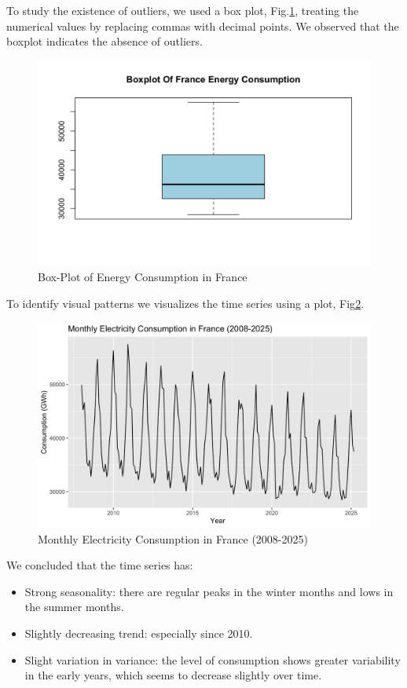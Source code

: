 To study the existence of outliers, we used a box plot, Fig.\ref{fig:bx-plot}, treating the numerical values by replacing commas with decimal points. We observed that the boxplot indicates the absence of outliers.

\begin{figure}[H]
    \centering
    \includegraphics[width=0.75\linewidth]{images/box-plot.png}
    \caption{Box-Plot of Energy Consumption in France}
    \label{fig:bx-plot}
\end{figure}

To identify visual patterns we visualizes the time series using a plot, Fig\ref{fig:f-plot}. 
\begin{figure}[H]
    \centering
    \includegraphics[width=0.75\linewidth]{images/f-plot.png}
    \caption{Monthly Electricity Consumption in France (2008-2025)}
    \label{fig:f-plot}
\end{figure}
We concluded that the time series has:
\begin{itemize}
    \item Strong seasonality: there are regular peaks in the winter months and lows in the summer months.
    \item Slightly decreasing trend: especially since 2010.
    \item Slight variation in variance: the level of consumption shows greater variability in the early years, which seems to decrease slightly over time.
\end{itemize}

